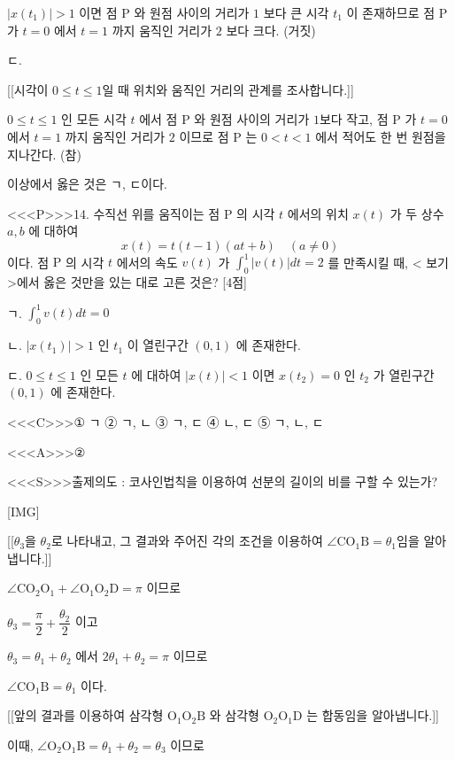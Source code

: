 \documentclass{oblivoir}
\begin{document}
$\left|x\left(t_{1}\right)\right|>1$ 이면 점 $\mathrm{P}$ 와 원점 사이의 거리가 $1$ 보다 큰 시각 $t_{1}$ 이 존재하므로 점 $\mathrm{P}$ 가 $t=0$ 에서 $t=1$ 까지 움직인 거리가 $2$ 보다 크다. (거짓)

ㄷ.

[[시각이 $0 \leq t \leq 1$일 때 위치와 움직인 거리의 관계를 조사합니다.]]

$0 \leq t \leq 1$ 인 모든 시각 $t$ 에서 점 $\mathrm{P}$ 와 원점 사이의 거리가 $1$보다 작고, 점 $\mathrm{P}$ 가 $t=0$ 에서 $t=1$ 까지 움직인 거리가 $2$ 이므로 점 $\mathrm{P}$ 는 $0< t< 1$ 에서 적어도 한 번 원점을 지나간다. (참)

이상에서 옳은 것은 ㄱ, ㄷ이다.


<<<P>>>14. 수직선 위를 움직이는 점 $\mathrm{P}$ 의 시각 $t$ 에서의 위치 $x(t)$ 가 두 상수 $a, b$ 에 대하여
$$
x(t)=t(t-1)(a t+b) \quad(a \neq 0)
$$
이다. 점 $\mathrm{P}$ 의 시각 $t$ 에서의 속도 $v(t)$ 가 $\displaystyle\int_{0}^{1}|v(t)| d t=2$ 를 만족시킬 때, < 보기>에서 옳은 것만을 있는 대로 고른 것은?
[4점]

ㄱ. $\displaystyle\int_{0}^{1} v(t) d t=0$

ㄴ. $\left|x\left(t_{1}\right)\right|>1$ 인 $t_{1}$ 이 열린구간 $(0,1)$ 에 존재한다.

ㄷ. $0 \leq t \leq 1$ 인 모든 $t$ 에 대하여 $|x(t)|< 1$ 이면 $x\left(t_{2}\right)=0$ 인 $t_{2}$ 가 열린구간 $(0,1)$ 에 존재한다.

<<<C>>>① ㄱ
② ㄱ, ㄴ
③ ㄱ, ㄷ
④ ㄴ, ㄷ
⑤ ㄱ, ㄴ, ㄷ

<<<A>>>②

<<<S>>>출제의도 : 코사인법칙을 이용하여 선분의 길이의 비를 구할 수 있는가?

[IMG]

[[$\theta_{3}$을 $\theta_{2}$로 나타내고, 그 결과와 주어진 각의 조건을 이용하여 $\angle \mathrm{CO_{1}B}=\theta_{1}$임을 알아냅니다.]]

$\angle \mathrm{CO_{2}O_{1}}+\angle \mathrm{O_{1} O_{2} D}=\pi$ 이므로

$\theta_{3}=\dfrac{\pi}{2}+\dfrac{\theta_{2}}{2}$ 이고

$\theta_{3}=\theta_{1}+\theta_{2}$ 에서 $2 \theta_{1}+\theta_{2}=\pi$ 이므로

$\angle \mathrm{CO_{1}B}=\theta_{1}$ 이다.

[[앞의 결과를 이용하여 삼각형 $\mathrm{O_{1} O_{2} B}$ 와 삼각형 $\mathrm{O_{2} O_{1} D}$ 는 합동임을 알아냅니다.]]

이때, $\angle \mathrm{O_{2} O_{1} B}=\theta_{1}+\theta_{2}=\theta_{3}$ 이므로
\end{document}
